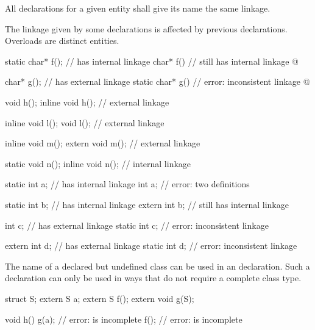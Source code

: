 \pnum
All declarations for a given entity shall give its name the same linkage.
\begin{note}
The linkage given by some declarations is affected by previous declarations.
Overloads are distinct entities.
\end{note}
\begin{example}
\begin{codeblock}
static char* f();               //  has internal linkage
char* f()                       //  still has internal linkage
  { @\commentellip@ }

char* g();                      //  has external linkage
static char* g()                // error: inconsistent linkage
  { @\commentellip@ }

void h();
inline void h();                // external linkage

inline void l();
void l();                       // external linkage

inline void m();
extern void m();                // external linkage

static void n();
inline void n();                // internal linkage

static int a;                   //  has internal linkage
int a;                          // error: two definitions

static int b;                   //  has internal linkage
extern int b;                   //  still has internal linkage

int c;                          //  has external linkage
static int c;                   // error: inconsistent linkage

extern int d;                   //  has external linkage
static int d;                   // error: inconsistent linkage
\end{codeblock}
\end{example}

\pnum
{}%
The name of a declared but undefined class can be used in an
 declaration. Such a declaration can only be used in ways
that do not require a complete class type.
\begin{example}
\begin{codeblock}
struct S;
extern S a;
extern S f();
extern void g(S);

void h() {
  g(a);                         // error:  is incomplete
  f();                          // error:  is incomplete
}
\end{codeblock}
\end{example}

